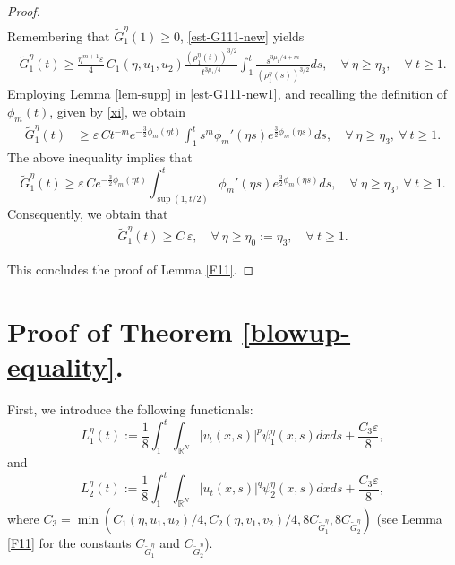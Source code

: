 \documentclass[12pt,leqno]{amsart}
\numberwithin{equation}{section}
\theoremstyle{remark}
\def\R{{\mathbb{R}}}
\def\e{{\varepsilon}}
\begin{document}
\begin{proof}
\begin{align}
\end{align}
Remembering that $\tilde{G}^{\eta}_1(1) \ge 0$, \eqref{est-G111-new} yields
\begin{align}\label{est-G111-new1}
 \tilde{G}^{\eta}_1(t)
\ge \frac{\eta^{m+1} \e}{4} \, C_1(\eta, u_1,u_2)\frac{\left(\rho^{\eta}_1(t)\right)^{3/2}}{t^{3\mu_1/4}}
\int_{1}^t\frac{s^{3\mu_1/4+m}}{\left(\rho^{\eta}_1(s)\right)^{3/2}}ds, \quad \forall \ \eta \ge  \eta_3, \quad \forall \ t  \ge  1. 
\end{align}
Employing Lemma \ref{lem-supp} in \eqref{est-G111-new1}, and recalling the definition of $\phi_{m}(t)$, given by \eqref{xi},   we obtain
\begin{align}\label{est-G111-new2}
 \tilde{G}^{\eta}_1(t)
&\ge  \e \, C t^{-m}e^{-\frac32\phi_{m}(\eta t)}\int^t_{1}s^{m}\phi_{m}'(\eta s)e^{\frac32 \phi_{m}(\eta s)}ds, \quad \forall \ \eta \ge  \eta_3, \ \forall \ t \ge 1.
\end{align}
The above inequality implies that
\begin{equation}\label{est-G2-12}
 \tilde{G}^{\eta}_1(t)
\ge   \e \, C e^{-\frac32\phi_{m}(\eta t)}\int^t_{\sup(1,t/2)}\phi_{m}'(\eta s)e^{\frac32 \phi_{m}(\eta s)}ds, \quad \forall \ \eta \ge  \eta_3, \ \forall \ t \ge 1.
\end{equation}
Consequently, we obtain that
\begin{align}\label{est-G1-2}
 \tilde{G}^{\eta}_1(t)
\ge  C\,{\e}, \quad \forall \ \eta \ge  \eta_0:=\eta_3, \quad \forall \ t \ge 1.
\end{align}

This concludes the proof of Lemma \ref{F11}.
\end{proof}









\section{Proof of Theorem \ref{blowup-equality}.}\label{sec-ut}



First,  we introduce  the following functionals:
\begin{equation}\label{L1}
L^{\eta}_1(t):=
\frac{1}{8}\int_{1}^t  \int_{\R^N}|v_t(x,s)|^p\psi^{\eta}_1(x,s)dx ds
+\frac{C_3 \e}{8},
\end{equation}
and
\begin{equation}\label{L2}
L^{\eta}_2(t):=
\frac{1}{8}\int_{1}^t  \int_{\R^N}|u_t(x,s)|^q\psi^{\eta}_2(x,s)dx ds
+\frac{C_3 \e}{8},
\end{equation}
where $C_3=\min(C_1(\eta,u_1,u_2)/4,C_2(\eta, v_1,v_2)/4,8C_{\tilde{G}^{\eta}_1},8C_{\tilde{G}^{\eta}_2})$ (see Lemma  \ref{F11} for the constants $C_{\tilde{G}^{\eta}_1}$ and $C_{\tilde{G}^{\eta}_2}$). 
\end{document}

